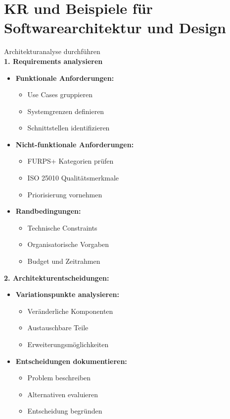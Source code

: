\section{KR und Beispiele für Softwarearchitektur und Design}

\begin{KR}{Architekturanalyse durchführen}\\
\textbf{1. Requirements analysieren}
\begin{itemize}
    \item \textbf{Funktionale Anforderungen:}
    \begin{itemize}
        \item Use Cases gruppieren
        \item Systemgrenzen definieren
        \item Schnittstellen identifizieren
    \end{itemize}
    
    \item \textbf{Nicht-funktionale Anforderungen:}
    \begin{itemize}
        \item FURPS+ Kategorien prüfen
        \item ISO 25010 Qualitätsmerkmale
        \item Priorisierung vornehmen
    \end{itemize}
    
    \item \textbf{Randbedingungen:}
    \begin{itemize}
        \item Technische Constraints
        \item Organisatorische Vorgaben
        \item Budget und Zeitrahmen
    \end{itemize}
\end{itemize}

\textbf{2. Architekturentscheidungen:}
\begin{itemize}
    \item \textbf{Variationspunkte analysieren:}
    \begin{itemize}
        \item Veränderliche Komponenten
        \item Austauschbare Teile
        \item Erweiterungsmöglichkeiten
    \end{itemize}
    
    \item \textbf{Entscheidungen dokumentieren:}
    \begin{itemize}
        \item Problem beschreiben
        \item Alternativen evaluieren
        \item Entscheidung begründen
    \end{itemize}
\end{itemize}
\end{KR}

